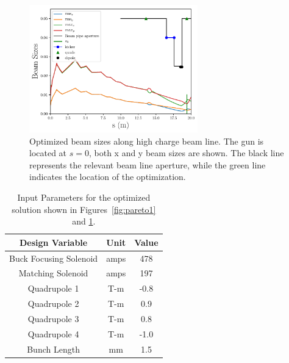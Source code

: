 \begin{figure}
	\includegraphics[width=0.65\textwidth]{figures/xy-max-min-sigma-paper}
	\caption{Optimized beam sizes along high charge beam line. The gun is located at $s=0$, 
	both x and y beam sizes are shown. The black line represents the relevant beam line aperture, while
	the green line indicates the location of the optimization.}
	\label{fig:stat}
\end{figure}
\begin{table}%
	\begin{center}
		\caption{Input Parameters for the optimized solution shown in Figures~\ref{fig:pareto1} and \ref{fig:stat}.}
		\label{tab:designopt}   
		\begin{tabular}{ccc}
			\toprule
			\textbf{Design Variable} & \textbf{Unit}	&  \textbf{Value}  \\ 
			\midrule
			{Buck Focusing Solenoid} & amps	& 478 \\
			Matching Solenoid &	amps	& 197	  \\
			Quadrupole 1& T-m		& -0.8	\\ 
			Quadrupole 2& T-m		& 0.9	\\
			Quadrupole 3 & T-m		& 0.8	\\
			Quadrupole 4 & T-m		& -1.0	\\ 
			Bunch Length & mm 		& 1.5	\\
			\bottomrule
		\end{tabular}
	\end{center}
\end{table}









